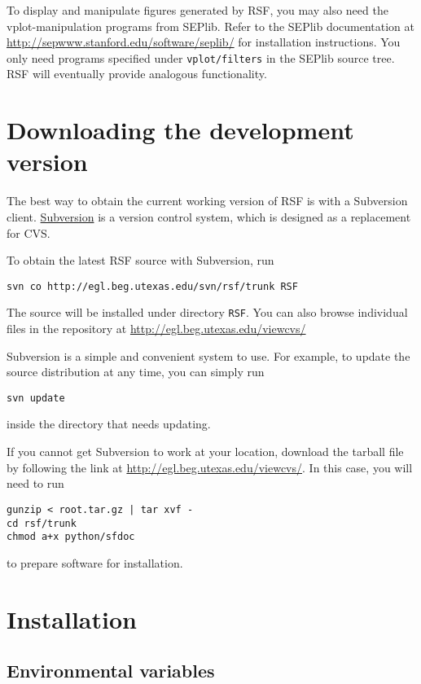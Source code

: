 To display and manipulate figures generated by RSF, you may also need the
vplot-manipulation programs from SEPlib. Refer to the SEPlib documentation at
\\ \url{http://sepwww.stanford.edu/software/seplib/} for installation
instructions. You only need programs specified under \texttt{vplot/filters} in
the SEPlib source tree. RSF will eventually provide analogous functionality.

\section{Downloading the development version}

The best way to obtain the current working version of RSF is with a Subversion
client. \href{http://subversion.tigris.org/}{Subversion} is a version control
system, which is designed as a replacement for CVS.

To obtain the latest RSF source with Subversion, run 
\begin{verbatim}
svn co http://egl.beg.utexas.edu/svn/rsf/trunk RSF
\end{verbatim}
The source will be installed under directory \texttt{RSF}. You can also browse
individual files in the repository at
\url{http://egl.beg.utexas.edu/viewcvs/}

Subversion is a simple and convenient system to use. For example, to update
the source distribution at any time, you can simply run
\begin{verbatim}
svn update
\end{verbatim}
inside the directory that needs updating.

If you cannot get Subversion to work at your location, download the tarball
file by following the link at \url{http://egl.beg.utexas.edu/viewcvs/}.
In this case, you will need to run
\begin{verbatim}
gunzip < root.tar.gz | tar xvf -
cd rsf/trunk
chmod a+x python/sfdoc
\end{verbatim}
to prepare software for installation.

\section{Installation}

\subsection{Environmental variables}

